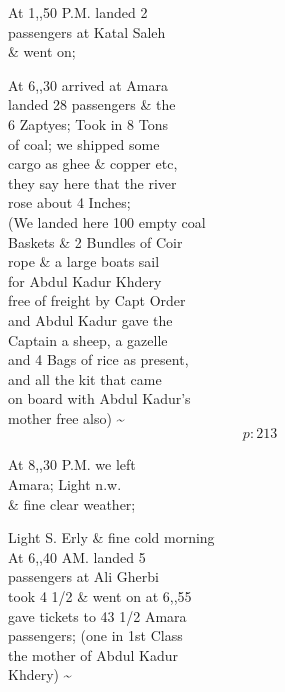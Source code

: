 \documentclass{report}
\begin{document}
	\par{
 	At 1,,50 P.M. landed 2\ \\passengers at Katal Saleh\ \\\& went on;\ \\
	}

	\par{
 	At 6,,30 arrived at Amara\ \\landed 28 passengers \& the\ \\6 Zaptyes; Took in 8 Tons\ \\of coal; we shipped some\ \\cargo as ghee \& copper etc,\ \\they say here that the river\ \\rose about 4 Inches;\ \\(We landed here 100 empty coal\ \\Baskets \& 2 Bundles of Coir\ \\rope \& a large boats sail\ \\for Abdul Kadur Khdery\ \\free of freight by Capt Order\ \\and Abdul Kadur gave the\ \\Captain a sheep, a gazelle\ \\and 4 Bags of rice as present,\ \\and all the kit that came\ \\on board with Abdul Kadur’s\ \\mother free also) \~{}\ \\
  \[p: 213 \]

	}


	\par{
 	At 8,,30 P.M. we left\ \\Amara; Light n.w.\ \\\& fine clear weather;\ \\
	}

	\par{
 	Light S. Erly \& fine cold morning\ \\At 6,,40 AM. landed 5\ \\passengers at Ali Gherbi\ \\took 4 1/2 \& went on at 6,,55\ \\gave tickets to 43 1/2 Amara\ \\passengers; (one in 1st Class\ \\the mother of Abdul Kadur\ \\Khdery) \~{}\ \\
	}
\end{document}
